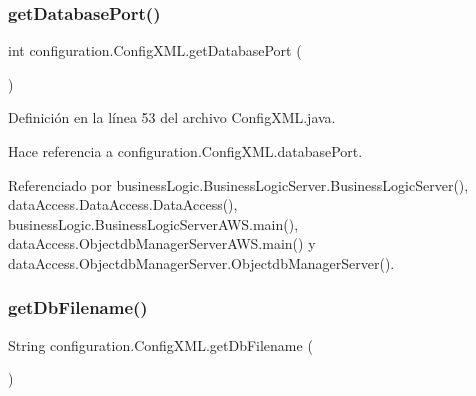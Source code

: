 \mbox{\label{classconfiguration_1_1ConfigXML_abf4649caafdcfb0b506af7402f09728c}} 
\subsubsection{\texorpdfstring{getDatabasePort()}{getDatabasePort()}}
{\footnotesize\ttfamily int configuration.\+Config\+X\+M\+L.\+get\+Database\+Port (\begin{DoxyParamCaption}{ }\end{DoxyParamCaption})}



Definición en la línea 53 del archivo Config\+X\+M\+L.\+java.


\begin{DoxyCode}{0}

\end{DoxyCode}


Hace referencia a configuration.\+Config\+X\+M\+L.\+database\+Port.



Referenciado por business\+Logic.\+Business\+Logic\+Server.\+Business\+Logic\+Server(), data\+Access.\+Data\+Access.\+Data\+Access(), business\+Logic.\+Business\+Logic\+Server\+A\+W\+S.\+main(), data\+Access.\+Objectdb\+Manager\+Server\+A\+W\+S.\+main() y data\+Access.\+Objectdb\+Manager\+Server.\+Objectdb\+Manager\+Server().

\mbox{\label{classconfiguration_1_1ConfigXML_a403cc4242d937a87dfea24caabaf535d}} 
\subsubsection{\texorpdfstring{getDbFilename()}{getDbFilename()}}
{\footnotesize\ttfamily String configuration.\+Config\+X\+M\+L.\+get\+Db\+Filename (\begin{DoxyParamCaption}{ }\end{DoxyParamCaption})}




